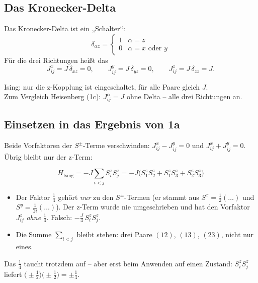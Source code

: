 \documentclass[11pt,a4paper]{article}
\begin{document}
\subsection{Das Kronecker-Delta}

Das Kronecker-Delta ist ein „Schalter“:
\[
\delta_{\alpha z} = \begin{cases} 1 & \alpha = z\\ 0 & \alpha = x \text{ oder } y\end{cases}
\]
Für die drei Richtungen heißt das
\[
J^x_{ij} = J\,\delta_{xz} = 0,\qquad J^y_{ij} = J\,\delta_{yz} = 0,\qquad J^z_{ij} = J\,\delta_{zz} = J .
\]

\begin{merk}
Ising: nur die z-Kopplung ist eingeschaltet, für alle Paare gleich $J$. \\
Zum Vergleich Heisenberg (1c): $J^\alpha_{ij} = J$ ohne Delta -- alle drei Richtungen an.
\end{merk}

\subsection{Einsetzen in das Ergebnis von 1a}

Beide Vorfaktoren der $S^\pm$-Terme verschwinden: $J^x_{ij} - J^y_{ij} = 0$ und $J^x_{ij} + J^y_{ij} = 0$. Übrig bleibt nur der z-Term:

\begin{tcolorbox}[colback=yellow!6,colframe=orange!70!black,fonttitle=\bfseries,title=Hamiltonian des Ising-Modells (Drei-Platz-Cluster)]
\[
H_\text{Ising} = -J\sum_{i<j} S^z_iS^z_j = -J\big(S^z_1S^z_2 + S^z_1S^z_3 + S^z_2S^z_3\big)
\]
\end{tcolorbox}

\begin{falle}
\begin{itemize}[leftmargin=*,itemsep=2pt]
\item Der Faktor $\tfrac14$ gehört \emph{nur} zu den $S^\pm$-Termen (er stammt aus $S^x=\tfrac12(\dots)$ und $S^y=\tfrac1{2i}(\dots)$). Der z-Term wurde nie umgeschrieben und hat den Vorfaktor $J^z_{ij}$ \emph{ohne} $\tfrac14$. Falsch: $-\tfrac J4\,S^z_iS^z_j$.
\item Die Summe $\sum_{i<j}$ bleibt stehen: drei Paare $(12)$, $(13)$, $(23)$, nicht nur eines.
\end{itemize}
\end{falle}

Das $\tfrac14$ taucht trotzdem auf -- aber erst beim Anwenden auf einen Zustand: $S^z_iS^z_j$ liefert $\big(\pm\tfrac12\big)\big(\pm\tfrac12\big) = \pm\tfrac14$.
\end{document}
